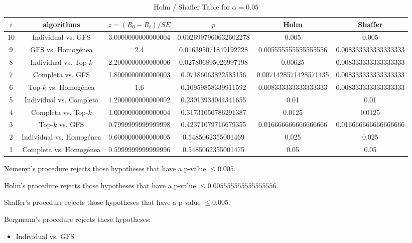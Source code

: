 \documentclass[a4paper,10pt]{article}
\begin{document}
\begin{landscape}
\begin{table}[!htp]
\centering\tiny
\caption{Holm / Shaffer Table for $\alpha=0.05$}
\begin{tabular}{cccccc}
$i$&algorithms&$z=(R_0 - R_i)/SE$&$p$&Holm&Shaffer\\
\hline
10&Individual vs. GFS&3.0000000000000004&0.0026997960632602278&0.005&0.005\\
9&GFS vs. Homogénea&2.4&0.016395071849192228&0.005555555555555556&0.008333333333333333\\
8&Individual vs. Top-$k$&2.2000000000000006&0.027806895026997198&0.00625&0.008333333333333333\\
7&Completa vs. GFS&1.8000000000000003&0.07186063822585156&0.0071428571428571435&0.008333333333333333\\
6&Top-$k$ vs. Homogénea&1.6&0.10959858339911592&0.008333333333333333&0.008333333333333333\\
5&Individual vs. Completa&1.2000000000000002&0.23013934044341655&0.01&0.01\\
4&Completa vs. Top-$k$&1.0000000000000004&0.31731050786291387&0.0125&0.0125\\
3&Top-$k$ vs. GFS&0.7999999999999998&0.42371079716679355&0.016666666666666666&0.016666666666666666\\
2&Individual vs. Homogénea&0.6000000000000005&0.5485062355001469&0.025&0.025\\
1&Completa vs. Homogénea&0.5999999999999996&0.5485062355001475&0.05&0.05\\
\hline
\end{tabular}
\end{table}
Nemenyi's procedure rejects those hypotheses that have a p-value $\le0.005$.


Holm's procedure rejects those hypotheses that have a p-value $\le0.005555555555555556$.


Shaffer's procedure rejects those hypotheses that have a p-value $\le0.005$.


Bergmann's procedure rejects these hypotheses:


\begin{itemize}


\item Individual vs. GFS
\end{itemize}



\end{landscape}
\end{document}

